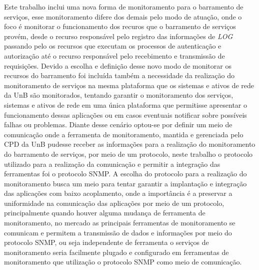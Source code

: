 Este trabalho inclui uma nova forma de monitoramento para o barramento de serviços, esse monitoramento difere dos demais pelo modo de atuação, onde o foco é monitorar o funcionamento dos recuros que o barramento de serviços provém, desde o recurso responsável pelo registro das informações de \textit{LOG} passando pelo os recursos que executam os processos de autenticação e autorização até o recurso responsável pelo recebimento e transmissão de requisições. Devido a escolha e definição desse novo modo de monitorar os recursos do barramento foi incluída também a necessidade da realização do monitoramento de serviços na mesma plataforma que os sistemas e ativos de rede da \acrshort{UnB} são monitorados, tentando garantir o monitoramento dos serviços, sistemas e ativos de rede em uma única plataforma que permitisse apresentar o funcionamento dessas aplicações ou em casos eventuais notificar sobre possíveis falhas ou problemas. Diante desse cenário optou-se por definir um meio de comunicação onde a ferramenta de monitoramento, mantida e gerenciada pelo \acrshort{CPD} da \acrshort{UnB} pudesse receber as informações para a realização do monitoramento do barramento de serviços, por meio de um protocolo, neste trabalho o protocolo utilizado para a realização da comunicação e permitir a integração das ferramentas foi o protocolo \acrshort{SNMP}. A escolha do protocolo para a realização do monitoramento busca um meio para tentar garantir a implantação e integração das aplicações com baixo acoplamento, onde a importância é a preservar a uniformidade na comunicação das aplicações por meio de um protocolo, principalmente quando houver alguma mudança de ferramenta de monitoramento, no mercado as principais ferramentas de monitoramento se comunicam e permitem a transmissão de dados e informações por meio do protocolo \acrshort{SNMP}, ou seja independente de ferramenta o serviços de monitoramento seria facilmente plugado e configurado em ferramentas de monitoramento que utilização o protocolo \acrshort{SNMP} como meio de comunicação.      

